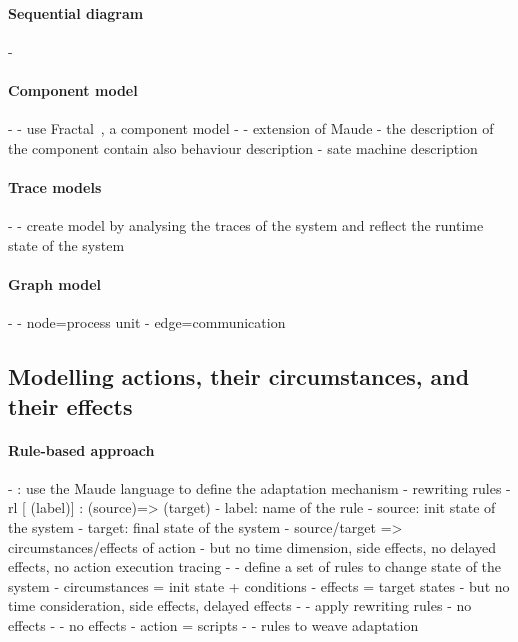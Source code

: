\paragraph{Sequential diagram}
- \cite{DBLP:conf/icse/TaharaOH17}

	
\paragraph{Component model} %
- \cite{DBLP:conf/soco/DavidL06}
	- use Fractal~\cite{DBLP:conf/cbse/BrunetonCLQS04}, a component model
- \cite{DBLP:conf/wetice/DjoudiBZ14}
	- extension of Maude
	- the description of the component contain also behaviour description
		- sate machine description
	
\paragraph{Trace models}
- \cite{DBLP:journals/computer/Maoz09}
	- create model by analysing the traces of the system and reflect the runtime state of the system
	
\paragraph{Graph model}
- \cite{DBLP:journals/tse/KramerM90}
	- node=process unit
	- edge=communication
	
	
	
	
	
	
	
	
	
\subsection[Modelling actions, their circumstances, and their effects]{Modelling \glspl{action}, their \glspl{circumstance}, and their effects}

\paragraph{Rule-based approach}
- \cite{DBLP:conf/icse/TaharaOH17}: use the Maude language to define the adaptation mechanism
	- rewriting rules
	- rl [ (label)] : (source)=> (target)
		- label: name of the rule
		- source: init state of the system
		- target: final state of the system
	- source/target => circumstances/effects of action
	 - but no time dimension, side effects, no delayed effects, no action execution tracing
- \cite{DBLP:conf/icse/ArcainiRS15}
	- define a set of rules to change state of the system
	- circumstances = init state + conditions
	- effects = target states
		- but no time consideration, side effects, delayed effects
- \cite{DBLP:conf/wrla/BruniCGLV12}
	- apply rewriting rules
	- no effects 
- \cite{DBLP:conf/eurosys/GraceHPBCT08}
	- no effects
	- action = scripts
- \cite{DBLP:conf/gpce/PintoFT03}
	- rules to weave adaptation
		
